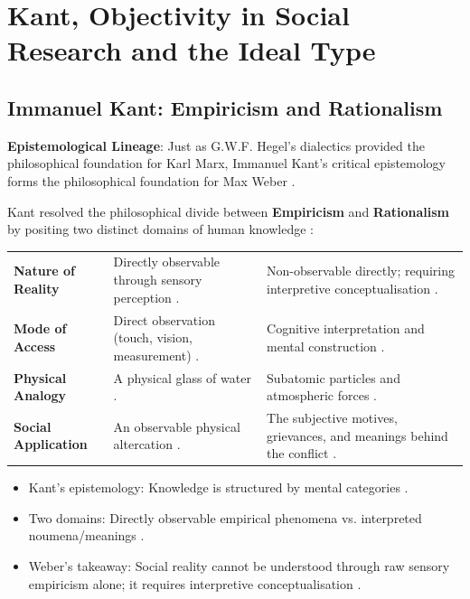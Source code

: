 \sectiondivider


\section{Kant, Objectivity in Social Research and the Ideal Type}

\subsection{Immanuel Kant: Empiricism and Rationalism}

\begin{KeyConcept}
\textbf{Epistemological Lineage}: Just as G.W.F. Hegel's dialectics provided the philosophical foundation for Karl Marx, Immanuel Kant's critical epistemology forms the philosophical foundation for Max Weber .
\end{KeyConcept}

Kant resolved the philosophical divide between \textbf{Empiricism} and \textbf{Rationalism} by positing two distinct domains of human knowledge :

\begin{table}[htbp]
\centering
\begin{tabularx}{\textwidth}{p{3.2cm} Y Y}
\hline
{}
 &  &  \\
\hline
\textbf{Nature of Reality} & Directly observable through sensory perception . & Non-observable directly; requiring interpretive conceptualisation . \\
\textbf{Mode of Access} & Direct observation (touch, vision, measurement) . & Cognitive interpretation and mental construction . \\
\textbf{Physical Analogy} & A physical glass of water . & Subatomic particles and atmospheric forces . \\
\textbf{Social Application} & An observable physical altercation . & The subjective motives, grievances, and meanings behind the conflict . \\
\hline
\end{tabularx}
\end{table}

\begin{QuickRevision}
\begin{itemize}
    \item Kant's epistemology: Knowledge is structured by mental categories .
    \item Two domains: Directly observable empirical phenomena vs. interpreted noumena/meanings .
    \item Weber's takeaway: Social reality cannot be understood through raw sensory empiricism alone; it requires interpretive conceptualisation .
\end{itemize}
\end{QuickRevision}


